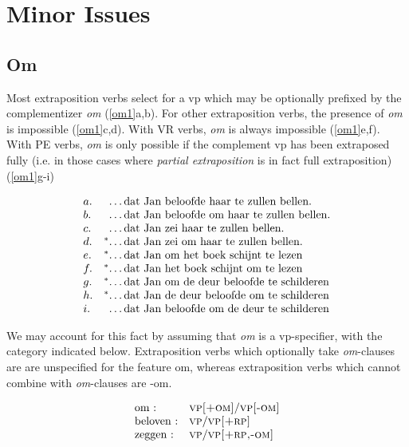 \section{Minor Issues}

\subsection{Om}

Most extraposition verbs select for a {\sc vp} which may be optionally prefixed
by the complementizer {\em om} (\ref{om1}a,b).  For other extraposition verbs,
the presence of {\em om} is impossible (\ref{om1}c,d).  With VR verbs, {\em om}
is always impossible (\ref{om1}e,f). With PE verbs, {\em om} is only possible if 
the complement {\sc vp} has been extraposed fully (i.e. in those cases where 
{\em partial extraposition} is in fact full extraposition) (\ref{om1}g-i)

\begin{equation}
\label{om1}
\begin{array}[t]{ll@{\hspace{0cm}}l}
a. && \ldots\mbox{dat Jan beloofde  haar te zullen bellen.} \\
b. && \ldots\mbox{dat Jan beloofde om haar te zullen bellen.} \\
c. && \ldots\mbox{dat Jan zei  haar te zullen bellen.} \\
d. &^*& \ldots\mbox{dat Jan zei om haar te zullen bellen.} \\
e. &^*& \ldots\mbox{dat Jan om het boek schijnt te lezen} \\
f. &^*& \ldots\mbox{dat Jan het boek schijnt om te lezen} \\
g. &^*& \ldots\mbox{dat Jan om de deur beloofde te schilderen} \\
h. &^*& \ldots\mbox{dat Jan de deur beloofde om te schilderen} \\
i. && \ldots\mbox{dat Jan beloofde om de deur te schilderen} \\
\end{array}
\end{equation}

We may account for this fact by assuming that {\em om} is a {\sc vp}-specifier,
with the category indicated below.  Extraposition verbs which optionally take
{\em om}-clauses are are unspecified for the feature {\sc om}, whereas
extraposition verbs which cannot combine with {\em om}-clauses are {\sc -om}.

\begin{equation}
\begin{array}[t]{ll}
\mbox{om :} & \mbox{\sc vp[+om]$/$vp[-om]} \\ 
\mbox{beloven :}& \mbox{\sc vp$/$vp[+rp]} \\
\mbox{zeggen :} & \mbox{\sc vp$/$vp[+rp,-om]} \\ 
\end{array}
\end{equation}

